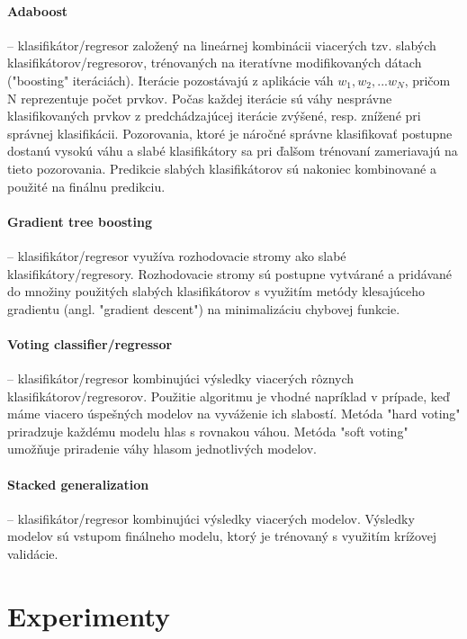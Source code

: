\documentclass[runningheads]{llncs}
\begin{document}
\paragraph{Adaboost} --
klasifikátor/regresor založený na lineárnej kombinácii viacerých tzv. slabých klasifikátorov/regresorov, trénovaných na iteratívne modifikovaných dátach ("boosting" iteráciách). Iterácie pozostávajú z aplikácie váh \(w_1, w_2, ... w_N\), pričom N reprezentuje počet prvkov. Počas každej iterácie sú váhy nesprávne klasifikovaných prvkov z predchádzajúcej iterácie zvýšené, resp. znížené pri správnej klasifikácii. Pozorovania, ktoré je náročné správne klasifikovať postupne dostanú vysokú váhu a slabé klasifikátory sa pri ďalšom trénovaní zameriavajú na tieto pozorovania. Predikcie slabých klasifikátorov sú nakoniec kombinované a použité na finálnu predikciu.

\paragraph{Gradient tree boosting} --
klasifikátor/regresor využíva rozhodovacie stromy ako slabé klasifikátory/regresory. Rozhodovacie stromy sú postupne vytvárané a pridávané do množiny použitých slabých klasifikátorov s využitím metódy klesajúceho gradientu (angl. "gradient descent") na minimalizáciu chybovej funkcie. 

\paragraph{Voting classifier/regressor} --
klasifikátor/regresor kombinujúci výsledky viacerých rôznych klasifikátorov/regresorov. Použitie algoritmu je vhodné napríklad v prípade, keď máme viacero úspešných modelov na vyváženie ich slabostí. Metóda "hard voting" priradzuje každému modelu hlas s rovnakou váhou. Metóda "soft voting" umožňuje priradenie váhy hlasom jednotlivých modelov.  

\paragraph{Stacked generalization} --
klasifikátor/regresor kombinujúci výsledky viacerých modelov. Výsledky modelov sú vstupom finálneho modelu, ktorý je trénovaný s využitím krížovej validácie. 


\section{Experimenty}
\end{document}
